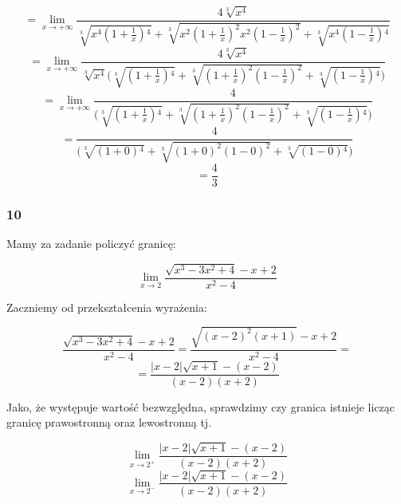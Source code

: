 \documentclass{article}
\begin{document}
\begin{equation*}
    = \lim_{x \to + \infty} \frac{4 \sqrt[3]{x^4}}{\sqrt[3]{x^{4} (1 + \frac{1}{x}){^4}} + \sqrt[3]{x^{2} (1 + \frac{1}{x})^{2} x^{2} (1 - \frac{1}{x})^{2}} +  \sqrt[3]{x^{4} (1 - \frac{1}{x}){^4}}}
\end{equation*}
\begin{equation*}
    = \lim_{x \to + \infty} \frac{4 \sqrt[3]{x^4}}{\sqrt[3]{x^{4}} \Bigg(\sqrt[3]{(1 + \frac{1}{x}){^4}} + \sqrt[3]{(1 + \frac{1}{x})^{2}(1 - \frac{1}{x})^{2}} +  \sqrt[3]{(1 - \frac{1}{x}){^4}}\Bigg)}
\end{equation*}
\begin{equation*}
    = \lim_{x \to + \infty} \frac{4}{\Bigg(\sqrt[3]{(1 + \frac{1}{x}){^4}} + \sqrt[3]{(1 + \frac{1}{x})^{2}(1 - \frac{1}{x})^{2}} +  \sqrt[3]{(1 - \frac{1}{x}){^4}}\Bigg)}
\end{equation*}
\begin{equation*}
    = \frac{4}{\Bigg(\sqrt[3]{(1 + 0){^4}} + \sqrt[3]{(1 + 0)^{2}(1 - 0)^{2}} +  \sqrt[3]{(1 - 0){^4}}\Bigg)}
\end{equation*}
\begin{equation*}
    = \frac{4}{3}
\end{equation*}

\subsubsection*{10}
Mamy za zadanie policzyć granicę:

\begin{equation*}
    \lim_{x \to 2} \frac{\sqrt{x^3 - 3x^2 +4} -x + 2}{x^2 - 4} 
\end{equation*}


Zaczniemy od przekształcenia wyrażenia:

\begin{equation*}
    \frac{\sqrt{x^3 - 3x^2 +4} -x + 2}{x^2 - 4} = \frac{\sqrt{(x - 2)^{2}(x+1)} -x + 2}{x^2 - 4} =
\end{equation*}
\begin{equation*}
    = \frac{|x-2|\sqrt{x+1} - (x - 2)}{(x -2)(x+2)}
\end{equation*}

Jako, że występuje wartość bezwzględna, sprawdzimy czy granica istnieje licząc granicę prawostronną oraz lewostronną tj.

\begin{equation*}
    \lim_{x \to 2^+} \frac{|x-2|\sqrt{x+1} - (x - 2)}{(x -2)(x+2)}
\end{equation*}
\begin{equation*}
    \lim_{x \to 2^-} \frac{|x-2|\sqrt{x+1} - (x - 2)}{(x -2)(x+2)}
\end{equation*}
\end{document}
